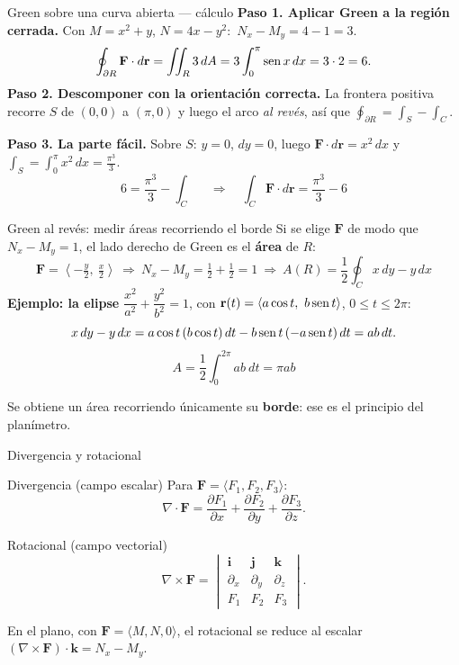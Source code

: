 \documentclass[11pt,aspectratio=169]{beamer}
\begin{document}
\begin{frame}{Green sobre una curva abierta --- cálculo}
  \textbf{Paso 1. Aplicar Green a la región cerrada.} Con $M=x^2+y$, $N=4x-y^2$:\ $N_x-M_y=4-1=3$.
  \[
    \oint_{\partial R}\mathbf F\cdot d\mathbf r = \iint_R 3\,dA
    = 3\int_0^\pi \operatorname{sen} x\,dx = 3\cdot2 = 6.
  \]
  \pause
  \textbf{Paso 2. Descomponer con la orientación correcta.} La frontera positiva recorre $S$ de $(0,0)$ a $(\pi,0)$ y luego el arco \emph{al revés}, así que $\oint_{\partial R} = \int_S - \int_C$.
  \pause
  \vspace{4pt}

  \textbf{Paso 3. La parte fácil.} Sobre $S$: $y=0$, $dy=0$, luego $\mathbf F\cdot d\mathbf r = x^2\,dx$ y
  $\displaystyle\int_S = \int_0^\pi x^2\,dx = \frac{\pi^3}{3}$.
  \pause
  \[
    6 = \frac{\pi^3}{3}-\int_C
    \quad\Longrightarrow\quad
    \boxed{\int_C \mathbf F\cdot d\mathbf r = \frac{\pi^3}{3}-6}
  \]
\end{frame}

\begin{frame}{Green al revés: medir áreas recorriendo el borde}
  Si se elige $\mathbf F$ de modo que $N_x-M_y=1$, el lado derecho de Green es el \textbf{área} de $R$:
  \[
    \mathbf F=\left\langle-\tfrac{y}{2},\ \tfrac{x}{2}\right\rangle
    \ \Longrightarrow\ N_x-M_y=\tfrac12+\tfrac12=1
    \ \Longrightarrow\
    \boxed{A(R)=\frac12\oint_C x\,dy-y\,dx}
  \]
  \pause
  \textbf{Ejemplo: la elipse} $\dfrac{x^2}{a^2}+\dfrac{y^2}{b^2}=1$, con $\mathbf r(t)=\langle a\cos t,\ b\operatorname{sen} t\rangle$, $0\le t\le2\pi$:
  \[
    x\,dy-y\,dx
    = a\cos t\,(b\cos t)\,dt - b\operatorname{sen} t\,(-a\operatorname{sen} t)\,dt
    = ab\,dt .
  \]
  \pause
  \[
    A=\frac12\int_0^{2\pi} ab\ dt = \boxed{\pi ab}
  \]
  \pause
  \begin{center}\small\color{gray60} Se obtiene un área recorriendo únicamente su \textbf{borde}: ese es el principio del planímetro. \end{center}
\end{frame}

\begin{frame}{Divergencia y rotacional}
  \begin{block}{Divergencia (campo escalar)}
    Para $\mathbf F=\langle F_1,F_2,F_3\rangle$:
    \[
      \nabla\cdot\mathbf F
      = \frac{\partial F_1}{\partial x}+\frac{\partial F_2}{\partial y}+\frac{\partial F_3}{\partial z}.
    \]
  \end{block}
  \pause
  \begin{block}{Rotacional (campo vectorial)}
    \[
      \nabla\times\mathbf F
      = \begin{vmatrix}
          \mathbf i & \mathbf j & \mathbf k\\
          \partial_x & \partial_y & \partial_z\\
          F_1 & F_2 & F_3
        \end{vmatrix}.
    \]
  \end{block}
  \pause
  \begin{center}\small\color{gray60}
  En el plano, con $\mathbf F=\langle M,N,0\rangle$, el rotacional se reduce al escalar $(\nabla\times\mathbf F)\cdot\mathbf k = N_x-M_y$.
  \end{center}
\end{frame}
\end{document}
